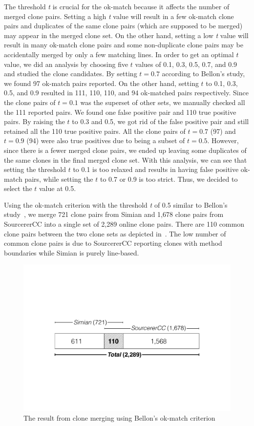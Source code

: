 \documentclass[10pt,journal,compsoc]{IEEEtran}
\begin{document}
The threshold \textit{t} is crucial for the ok-match because it affects the number
of merged clone pairs. Setting a high \textit{t} value will result in a few ok-match clone pairs
and duplicates of the same clone pairs (which are supposed to be merged) may appear in the merged
clone set. On the other hand, setting a low \textit{t} value will result in many ok-match clone
pairs and some non-duplicate clone pairs may be accidentally merged by only
a few matching lines.
In order to get an optimal $t$ value, we did an analysis by choosing
five $t$ values of 0.1, 0.3, 0.5, 0.7, and 0.9 and studied the clone candidates.
By setting $t=0.7$ according to Bellon's study, we
found 97 ok-match pairs reported. On the other hand, setting $t$ to 0.1, 0.3,
0.5, and 0.9 resulted in 111, 110, 110, and 94 ok-matched pairs respectively.
Since the clone pairs of $t=0.1$ was the superset of other sets,  we manually
checked all the 111 reported pairs. We found one false positive pair and 110
true positive pairs. By raising the $t$ to 0.3 and 0.5, we got rid of the false
positive pair and still retained all the 110 true positive pairs. All the clone
pairs of $t=0.7$ (97) and $t=0.9$ (94) were also true positives due to being a
subset of $t=0.5$. However, since there is a fewer merged clone pairs, 
we ended up leaving some duplicates of the same clones in the final merged clone set.
With this analysis, we can see that setting the threshold $t$ to 0.1 is too
relaxed and results in having false positive ok-match pairs, while setting the
$t$ to 0.7 or 0.9 is too strict. Thus,
we decided to select the $t$ value at 0.5. 

Using the ok-match criterion with the threshold \textit{t} of 0.5
similar to Bellon's study~\cite{Bellon2007}, we merge 721 clone pairs from
Simian and 1,678 clone pairs from SourcererCC into a single set of 2,289 online
clone pairs. There are 110 common clone pairs between the two clone sets 
as depicted in~.  The low number of common
clone pairs is due to SourcererCC reporting clones with method
boundaries while Simian is purely line-based.

\begin{figure}
	\centering
	\includegraphics[width=0.8\linewidth]{clone_merging}
	\caption{The result from clone merging using Bellon's ok-match criterion}
	\label{fig:clonemerging}
\end{figure}
\end{document}
